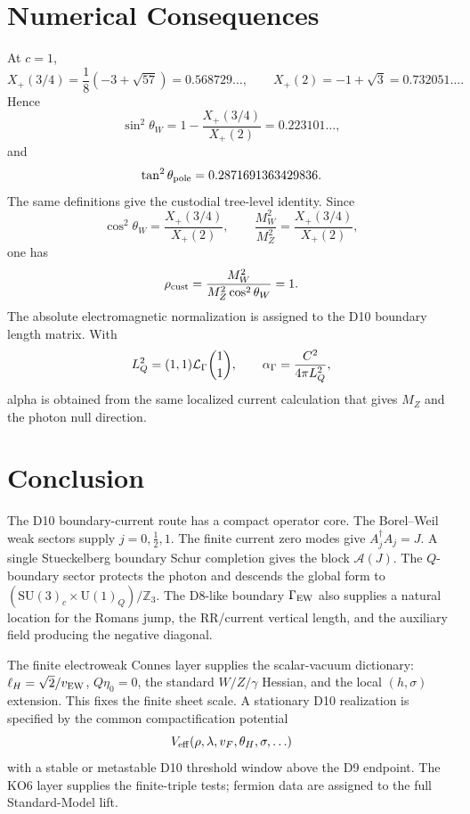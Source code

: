 \documentclass[11pt]{article}
\theoremstyle{definition}
\theoremstyle{remark}
\newcommand{\SU}{\mathrm{SU}}
\newcommand{\U}{\mathrm{U}}
\newcommand{\Z}{\mathbb{Z}}
\newcommand{\half}{\tfrac12}
\newcommand{\cA}{\mathcal A}
\newcommand{\Xp}{X_+}
\begin{document}

\section{Numerical Consequences}

At \(c=1\),
\[
  \Xp(3/4)=\frac18(-3+\sqrt{57})=0.568729\ldots,
  \qquad
  \Xp(2)=-1+\sqrt3=0.732051\ldots .
\]
Hence
\[
  \sin^2\theta_W
  =
  1-\frac{\Xp(3/4)}{\Xp(2)}
  =
  0.223101\ldots,
\]
and
\[
  \tan^2\theta_{\rm pole}=0.2871691363429836.
\]
The same definitions give the custodial tree-level identity.  Since
\[
  \cos^2\theta_W=\frac{\Xp(3/4)}{\Xp(2)},
  \qquad
  \frac{M_W^2}{M_Z^2}=\frac{\Xp(3/4)}{\Xp(2)},
\]
one has
\[
  \rho_{\rm cust}
  =
  \frac{M_W^2}{M_Z^2\cos^2\theta_W}
  =1.
\]
The absolute electromagnetic normalization is assigned to the D10 boundary
length matrix.  With
\[
  L_Q^2=(1,1){\cal L}_\Gamma\binom{1}{1},
  \qquad
  \alpha_\Gamma=\frac{C^2}{4\pi L_Q^2},
\]
alpha is obtained from the same localized current calculation that gives
\(M_Z\) and the photon null direction.

\section{Conclusion}

The D10 boundary-current route has a compact operator core.  The
Borel--Weil weak sectors supply \(j=0,\half,1\).  The finite current zero modes
give \(A_j^\dagger A_j=J\).  A single Stueckelberg boundary Schur completion
gives the block \(\cA(J)\).  The \(Q\)-boundary sector protects the photon and
descends the global form to \((\SU(3)_c\times\U(1)_Q)/\Z_3\).  The D8-like
boundary \(\Gamma_{\rm EW}\) also supplies a natural location for the Romans
jump, the RR/current vertical length, and the auxiliary field producing the
negative diagonal.

The finite electroweak Connes layer supplies the scalar-vacuum dictionary:
\(\ell_H=\sqrt2/v_{\rm EW}\), \(Q\eta_0=0\), the standard \(W/Z/\gamma\)
Hessian, and the local \((h,\sigma)\) extension.  This fixes the finite sheet
scale.  A stationary D10 realization is specified by the common compactification
potential
\[
  V_{\rm eff}(\rho,\lambda,v_F,\theta_H,\sigma,\ldots)
\]
with a stable or metastable D10 threshold window above the D9 endpoint.  The
KO6 layer supplies the finite-triple tests; fermion data are assigned to the
full Standard-Model lift.
\end{document}
